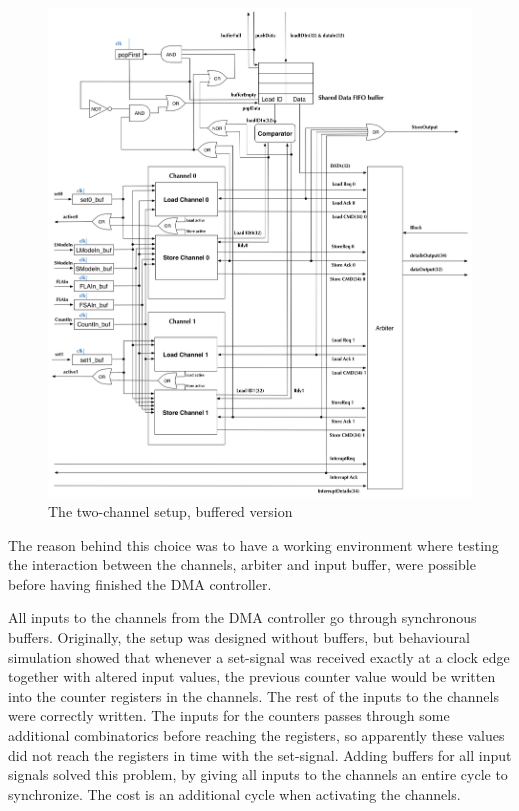 \begin{appendix}
\begin{figure}[htb]
    \centering
    \includegraphics[width=1.1\textwidth]{Figures/DMA/TwoChannelSetUpBuffered}
    \caption{The two-channel setup, buffered version}
    \label{fig:twoChannelSetup}
\end{figure}

The reason behind this choice was to have a working environment where testing the interaction between the channels, arbiter and input buffer, were possible before having finished the DMA controller.

All inputs to the channels from the DMA controller go through synchronous buffers.
Originally, the setup was designed without buffers, but behavioural simulation showed that whenever a set-signal was received exactly at a clock edge together with altered input values, the previous counter value would be written into the counter registers in the channels.
The rest of the inputs to the channels were correctly written.
The inputs for the counters passes through some additional combinatorics before reaching the registers, so apparently these values did not reach the registers in time with the set-signal.
Adding buffers for all input signals solved this problem, by giving all inputs to the channels an entire cycle to synchronize.
The cost is an additional cycle when activating the channels.


\end{appendix}
